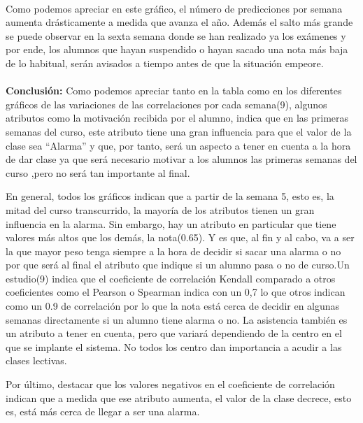 \paragraph{}
Como podemos apreciar en este gráfico, el número de predicciones por semana aumenta drásticamente a medida que avanza el año. Además el salto más grande se puede observar en la sexta semana donde se han realizado ya los exámenes y por ende, los alumnos que hayan suspendido o hayan sacado una nota más baja de lo habitual, serán avisados a tiempo antes de que la situación empeore.

\paragraph{}
\textbf{Conclusión:}
Como  podemos apreciar tanto en la tabla como en los diferentes gráficos de las variaciones de las correlaciones por cada semana(9), algunos atributos como la motivación recibida por el alumno, indica que en las primeras semanas del curso, este atributo tiene una gran influencia para que el valor de la clase sea “Alarma” y que, por tanto, será un aspecto a tener en cuenta a la hora de dar clase ya que será necesario motivar a los alumnos las primeras semanas del curso ,pero no será tan importante al final.

En general, todos los gráficos indican que a partir de la semana 5, esto es, la mitad del curso transcurrido, la mayoría de los atributos tienen un gran influencia en la alarma. Sin embargo, hay un atributo en particular que tiene valores más altos que los demás, la nota(0.65). Y es que, al fin y al cabo, va a ser la que mayor peso tenga siempre a la hora de decidir si sacar una alarma o no por que será al final el atributo que indique si un alumno pasa o no de curso.Un estudio(9) indica que el coeficiente de correlación Kendall comparado a otros coeficientes como el Pearson o Spearman indica con un 0,7 lo que otros indican como un 0.9 de correlación por lo que la nota está cerca de decidir en algunas semanas directamente si un alumno tiene alarma o no.
La asistencia también es un atributo a tener en cuenta, pero que variará dependiendo de la centro en el que se implante el sistema. No todos los centro dan importancia a acudir a las clases lectivas.

Por último, destacar que los valores negativos en el coeficiente de correlación indican que a medida que ese atributo aumenta, el valor de la clase decrece, esto es, está más cerca de llegar a ser una alarma.


